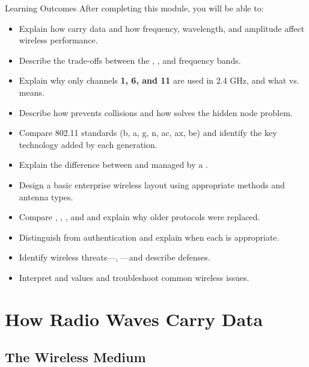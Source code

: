 \documentclass[aspectratio=169]{beamer}
\begin{document}
\begin{frame}[t,allowframebreaks]{Learning Outcomes}
    After completing this module, you will be able to:
    \vspace{0.3em}
    \footnotesize
    \begin{itemize}
        \item Explain how  carry data and how frequency, wavelength, and amplitude affect wireless performance.
        \item Describe the trade-offs between the , , and  frequency bands.
        \item Explain why only channels \textbf{1, 6, and 11} are used in 2.4 GHz, and what  vs.\  means.
        \item Describe how  prevents collisions and how  solves the hidden node problem.
        \item Compare 802.11 standards (b, a, g, n, ac, ax, be) and identify the key technology added by each generation.
        \item Explain the difference between  and  managed by a .
        \item Design a basic enterprise wireless layout using appropriate  methods and antenna types.
        \item Compare , , , and  and explain why older protocols were replaced.
        \item Distinguish  from  authentication and explain when each is appropriate.
        \item Identify wireless threats---, ---and describe defenses.
        \item Interpret  and  values and troubleshoot common wireless issues.
    \end{itemize}
\end{frame}

\section{How Radio Waves Carry Data}
\subsection{The Wireless Medium}
\end{document}
